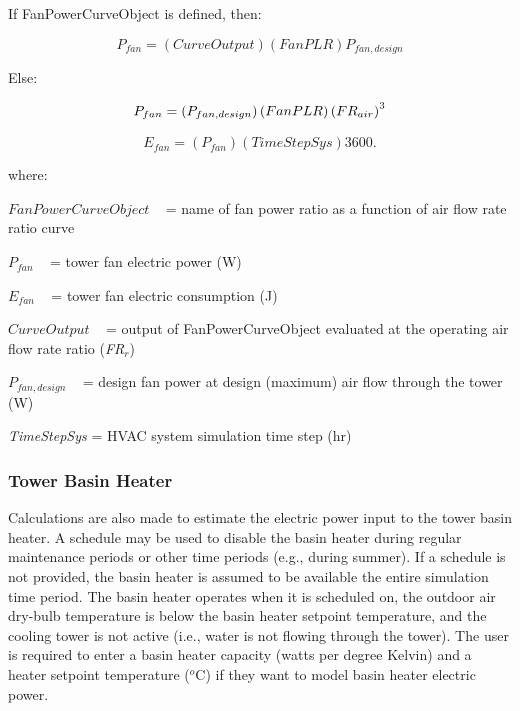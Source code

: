 If FanPowerCurveObject is defined, then:

\begin{equation}
  P_{fan} = \left( {CurveOutput} \right)\left( {FanPLR} \right){P_{fan,design}}
\end{equation}

Else:

\begin{equation}
  P_{fan} = \left( {{P_{fan,design}}} \right)\left( {FanPLR} \right){\left( {F{R_{air}}} \right)^{\rm{3}}}
\end{equation}

\begin{equation}
{E_{fan}} = \left( {{P_{fan}}} \right)\left( {TimeStepSys} \right)3600.
\end{equation}

where:

\(FanPowerCurveObject\) ~ = name of fan power ratio as a function of air flow rate ratio curve

\({P_{fan}}\) ~ = tower fan electric power (W)

\({E_{fan}}\) ~ = tower fan electric consumption (J)

\(CurveOutput\) ~ = output of FanPowerCurveObject evaluated at the operating air flow rate ratio (\emph{FR\(_{r}\)})

\({P_{fan,design}}\) ~ = design fan power at design (maximum) air flow through the tower (W)

\emph{TimeStepSys} = HVAC system simulation time step (hr)

\subsubsection{Tower Basin Heater}\label{tower-basin-heater-1}

Calculations are also made to estimate the electric power input to the tower basin heater. A schedule may be used to disable the basin heater during regular maintenance periods or other time periods (e.g., during summer). If a schedule is not provided, the basin heater is assumed to be available the entire simulation time period. The basin heater operates when it is scheduled on, the outdoor air dry-bulb temperature is below the basin heater setpoint temperature, and the cooling tower is not active (i.e., water is not flowing through the tower). The user is required to enter a basin heater capacity (watts per degree Kelvin) and a heater setpoint temperature (\(^{o}\)C) if they want to model basin heater electric power.

